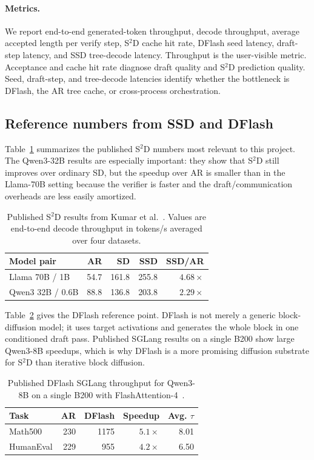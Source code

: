 \paragraph{Metrics.}
We report end-to-end generated-token throughput, decode throughput, average
accepted length per verify step, S$^2$D cache hit rate, DFlash seed latency,
draft-step latency, and SSD tree-decode latency. Throughput is the
user-visible metric. Acceptance and cache hit rate diagnose draft quality and
S$^2$D prediction quality. Seed, draft-step, and tree-decode latencies
identify whether the bottleneck is DFlash, the AR tree cache, or cross-process
orchestration.

\subsection{Reference numbers from SSD and DFlash}

Table~\ref{tab:ssd-reference} summarizes the published S$^2$D numbers most
relevant to this project. The Qwen3-32B results are especially important: they
show that S$^2$D still improves over ordinary SD, but the speedup over AR is
smaller than in the Llama-70B setting because the verifier is faster and the
draft/communication overheads are less easily amortized.

\begin{table}[t]
  \caption{Published S$^2$D results from Kumar et al.~\cite{saguaro2024}.
  Values are end-to-end decode throughput in tokens/s averaged over four
  datasets.}
  \label{tab:ssd-reference}
  \centering
  \footnotesize
  \begin{tabular}{@{}lrrrr@{}}
    \toprule
    Model pair & AR & SD & SSD & SSD/AR \\
    \midrule
    Llama 70B / 1B & 54.7 & 161.8 & 255.8 & $4.68\times$ \\
    Qwen3 32B / 0.6B & 88.8 & 136.8 & 203.8 & $2.29\times$ \\
    \bottomrule
  \end{tabular}
\end{table}

Table~\ref{tab:dflash-reference} gives the DFlash reference point. DFlash is
not merely a generic block-diffusion model; it uses target activations and
generates the whole block in one conditioned draft pass. Published SGLang
results on a single B200 show large Qwen3-8B speedups, which is why DFlash is
a more promising diffusion substrate for S$^2$D than iterative block
diffusion.

\begin{table}[t]
  \caption{Published DFlash SGLang throughput for Qwen3-8B on a single B200
  with FlashAttention-4~\cite{chen2026dflash}.}
  \label{tab:dflash-reference}
  \centering
  \footnotesize
  \begin{tabular}{@{}lrrrr@{}}
    \toprule
    Task & AR & DFlash & Speedup & Avg. $\tau$ \\
    \midrule
    Math500 & 230 & 1175 & $5.1\times$ & 8.01 \\
    HumanEval & 229 & 955 & $4.2\times$ & 6.50 \\
    \bottomrule
  \end{tabular}
\end{table}


